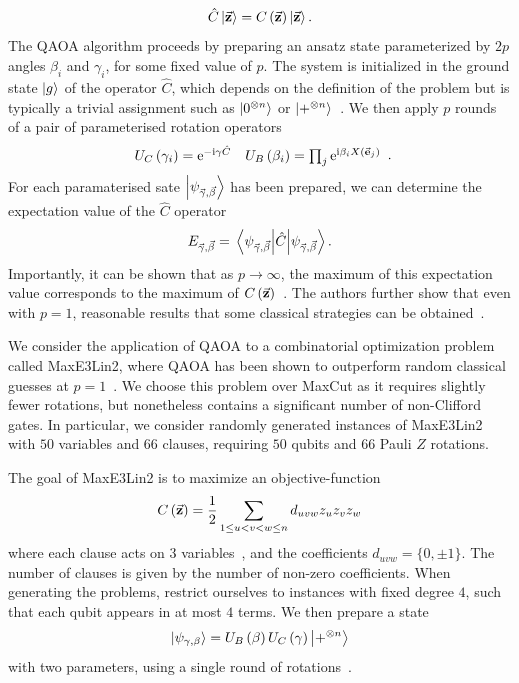 \[\hat{C}\ket{\va{z}}=C\left(\va{z}\right)\ket{\va{z}}.\]
The QAOA algorithm proceeds by preparing an ansatz state parameterized by $2p$ angles $\beta_{i}$ and $\gamma_{i}$, for some fixed value of $p$. The system is initialized in the ground state $\ket{g}$ of the operator $\hat{C}$, which depends on the definition of the problem but is typically a trivial assignment such as $\ket{0^{\otimes n}}$ or $\ket{+^{\otimes n}}$~\cite{Farhi2014,Farhi2014b}. We then apply $p$ rounds of a pair of parameterised rotation operators
\[\begin{array}{lr}
U_{C}\left(\gamma_{i}\right)=\mathrm{e}^{-\mathrm{i} \gamma \hat{C}} &  U_{B}\left(\beta_{i}\right) = \prod_{j}\mathrm{e}^{\mathrm{i}\beta_{i} X(\va{e}_{j})}
\end{array}.\]
For each paramaterised sate $\ket{\psi_{\va{\gamma},\va{\beta}}}$ has been prepared, we can determine the expectation value of the $\hat{C}$ operator 
\[E_{\va{\gamma},\va{\beta}}=\matrixel{\psi_{\va{\gamma},\va{\beta}}}{\hat{C}}{\psi_{\va{\gamma},\va{\beta}}}.\]
Importantly, it can be shown that as $p\rightarrow \infty$, the maximum of this expectation value corresponds to the maximum of $C\left(\va{z}\right)$~\cite{Farhi2014}. The authors further show that even with $p=1$, reasonable results that some classical strategies can be obtained~\cite{Farhi2014,Farhi2014b}.\par
We consider the application of QAOA to a combinatorial optimization problem called MaxE3Lin2, where QAOA has been shown to outperform random classical guesses at $p=1$~\cite{Farhi2014b}. We choose this problem over MaxCut as it requires slightly fewer rotations, but nonetheless contains a significant number of non-Clifford gates. In particular, we consider randomly generated instances of MaxE3Lin2 with $50$ variables and $66$ clauses, requiring $50$ qubits and $66$ Pauli $Z$ rotations.\par
The goal of MaxE3Lin2 is to maximize an objective-function
\[C\left(\va{z}\right) = \frac{1}{2}\sum_{1\leq u < v < w \leq n} d_{uvw}z_{u}z_{v}z_{w}\]
where each clause acts on $3$ variables~\cite{Farhi2014b,Bravyi2018}, and the coefficients $d_{uvw}=\{0,\pm1\}$. The number of clauses is given by the number of non-zero coefficients. When generating the problems, restrict ourselves to instances with fixed degree $4$, such that each qubit appears in at most $4$ terms. We then prepare a state 
\[\ket{\psi_{\gamma,\beta}} = U_{B}\left(\beta\right)U_{C}\left(\gamma\right)\ket{+^{\otimes n}}\]
with two parameters, using a single round of rotations~\cite{Farhi2014b}.\par
